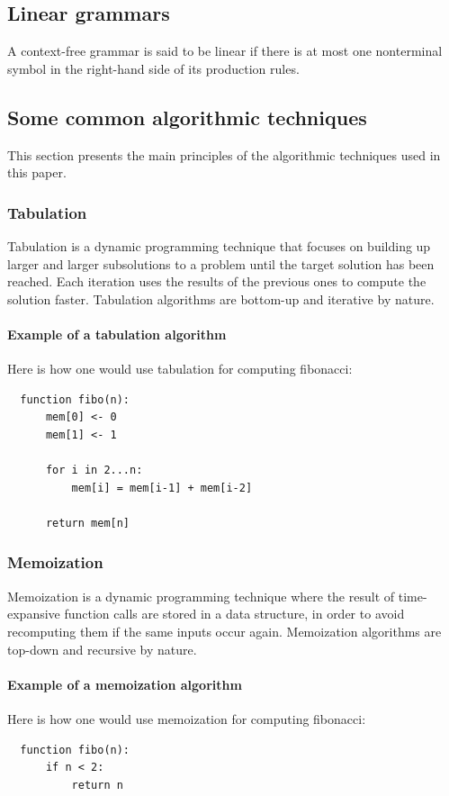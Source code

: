 \documentclass[12pt]{extarticle}
\begin{document}
\begin{multicols}{2}
\subsection{Linear grammars}\label{sec:linear}
A context-free grammar is said to be linear if there is at most one nonterminal
symbol in the right-hand side of its production rules.

\subsection{Some common algorithmic techniques}
This section presents the main principles of the algorithmic techniques used in this paper.

\subsubsection{Tabulation}
Tabulation is a dynamic programming technique that focuses on building up larger and larger subsolutions to a problem until the target solution has been reached. Each iteration uses the results of the previous ones to compute the solution faster. Tabulation algorithms are bottom-up and iterative by nature.

\paragraph{Example of a tabulation algorithm} Here is how one would use tabulation for computing fibonacci:\\
\begin{lstlisting}
  function fibo(n):
      mem[0] <- 0
      mem[1] <- 1

      for i in 2...n:
          mem[i] = mem[i-1] + mem[i-2]
      
      return mem[n]
\end{lstlisting}

\subsubsection{Memoization}
Memoization is a dynamic programming technique where the result of time-expansive function calls are stored in a data structure, in order to avoid recomputing them if the same inputs occur again. Memoization algorithms are top-down and recursive by nature.

\paragraph{Example of a memoization algorithm} Here is how one would use memoization for computing fibonacci:\\
\begin{lstlisting}
  function fibo(n):
      if n < 2:
          return n


\end{lstlisting}
\end{multicols}
\end{document}
